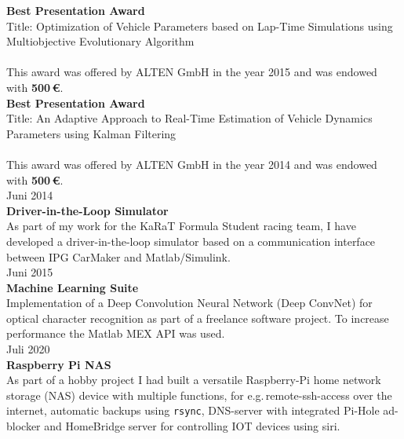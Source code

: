 \documentclass{mycv}
\begin{document}
{\rlap{\color{templateColor1}\rule[0mm]{\textwidth}{\ulinewidth}}}
\begin{paracol}{2}
	  {\RaggedLeft \bfseries Best Presentation Award\\}
	  {Title}: Optimization of Vehicle Parameters based on Lap-Time
	  Simulations using Multiobjective Evolutionary Algorithm\\\\
	  {\footnotesize This award was offered by ALTEN GmbH in the year 2015 and
			was endowed with {\bfseries500\,\euro{}}.}\\

	  {\RaggedLeft \bfseries Best Presentation Award\\}
	  {Title}: An Adaptive Approach to Real-Time Estimation of
	  Vehicle Dynamics Parameters using Kalman Filtering\\\\
	  {\footnotesize This award was offered by ALTEN GmbH in the year 2014 and
			was endowed with {\bfseries500\,\euro{}}.}\\


	{\RaggedLeft Juni 2014\\ \bfseries Driver-in-the-Loop Simulator\\}
	As part of my work for the KaRaT Formula Student racing team, I
	have developed a driver-in-the-loop simulator based on a communication
	interface between {IPG CarMaker} and {Matlab/Simulink}.\\

	{\RaggedLeft Juni 2015\\ \bfseries Machine Learning Suite\\}
	Implementation of a Deep Convolution Neural Network (Deep ConvNet) for
	optical character recognition as part of a freelance software project. To
	increase performance the {Matlab MEX API} was used.\\

	{\RaggedLeft Juli 2020\\ \bfseries Raspberry Pi NAS\\}
	As part of a hobby project I had built a versatile Raspberry-Pi home network
	storage (NAS) device with multiple functions, for e.g.\,remote-ssh-access
	over the internet, automatic backups using \verb|rsync|, DNS-server with
	integrated Pi-Hole ad-blocker and HomeBridge server for controlling IOT
	devices using siri.


\end{paracol}
\end{document}
